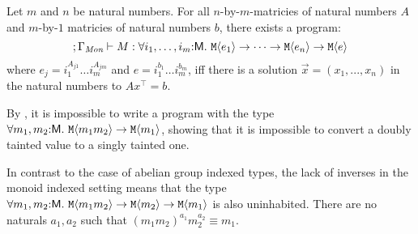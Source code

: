 







\begin{theorem}
  \label{thm:monoid-indefinability}
  Let $m$ and $n$ be natural numbers. For all $n$-by-$m$-matricies of
  natural numbers $A$ and $m$-by-$1$ matricies of natural numbers $b$,
  there exists a program:
  \begin{equation}
    ; \Gamma_{\textit{Mon}} \vdash M : \forall i_1,\dots,i_m\mathord:\mathsf{M}.\ \textup{\texttt{M}}\langle e_1 \rangle \to \dots \to \textup{\texttt{M}}\langle e_n \rangle \to \textup{\texttt{M}}\langle e \rangle
  \end{equation}
  where $e_j = i_1^{A_{j1}}\dots i_m^{A_{jm}}$ and $e = i_1^{b_1}\dots
  i_m^{b_m}$, iff there is a solution $\vec{x} = (x_1,...,x_n)$ in the
  natural numbers to $A x^\top = b$.
\end{theorem}

\begin{example}
  By , it is impossible to write a
  program with the type $\forall m_1,m_2 \mathord: \mathsf{M}.\
  \textup{\texttt{M}}\langle m_1m_2 \rangle \to \textup{\texttt{M}}\langle m_1 \rangle$, showing that it is
  impossible to convert a doubly tainted value to a singly tainted
  one.

  In contrast to the case of abelian group indexed types, the lack of
  inverses in the monoid indexed setting means that the type $\forall
  m_1,m_2\mathord:\mathsf{M}.\ \textup{\texttt{M}}\langle m_1m_2 \rangle \to \textup{\texttt{M}}\langle m_2 \rangle
  \to \textup{\texttt{M}}\langle m_1 \rangle$ is also uninhabited. There are no naturals
  $a_1,a_2$ such that $(m_1m_2)^{a_1}m_2^{a_2} \equiv m_1$.
\end{example}


